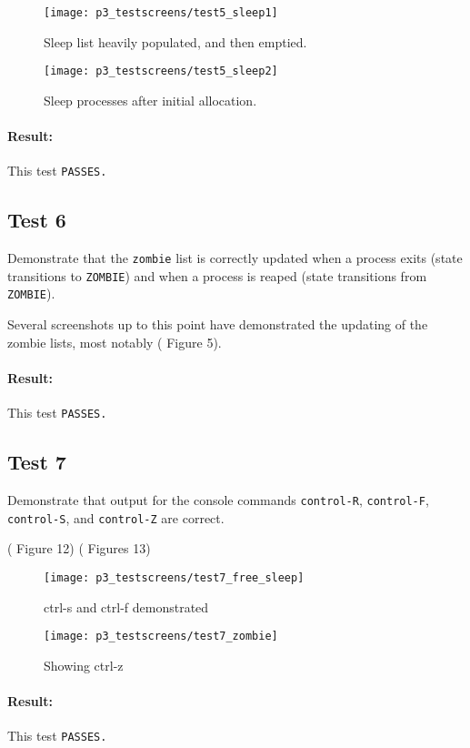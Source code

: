 \documentclass[11pt,letterpaper]{report}
\begin{document}
\begin{figure}
	\centering
	\texttt{[image: p3\_testscreens/test5\_sleep1]}
	\caption{Sleep list heavily populated, and then emptied.}
	\label{fig:test5sleep1}
\end{figure}

\begin{figure}
	\centering
	\texttt{[image: p3\_testscreens/test5\_sleep2]}
	\caption{Sleep processes after initial allocation.}
	\label{fig:test5sleep2}
\end{figure}

\paragraph{Result:} This test {\tt PASSES.}
 	
 	\subsection{Test 6}
 	Demonstrate that the {\tt zombie} list is correctly updated when a process exits (state transitions to {\tt ZOMBIE}) and when a process is reaped (state transitions from {\tt ZOMBIE}).
 	
 	Several screenshots up to this point have demonstrated the updating of the zombie lists, most notably ({\color{red} Figure 5}).
 	
 	\paragraph{Result:} This test {\tt PASSES.}
 	
 	\subsection{Test 7}
 	Demonstrate that output for the console commands {\tt control-R}, {\tt control-F}, {\tt control-S}, and {\tt control-Z} are correct.
 	
 	({\color{red} Figure 12})
 	({\color{red} Figures 13})
 	
 	
\begin{figure}
	\centering
	\texttt{[image: p3\_testscreens/test7\_free\_sleep]}
	\caption{ctrl-s and ctrl-f demonstrated}
	\label{fig:test7freesleep}
\end{figure}
 	
\begin{figure}
	\centering
	\texttt{[image: p3\_testscreens/test7\_zombie]}
	\caption{Showing ctrl-z}
	\label{fig:test7zombie}
\end{figure}


 	\paragraph{Result:} This test {\tt PASSES.}
 	
\end{document}
